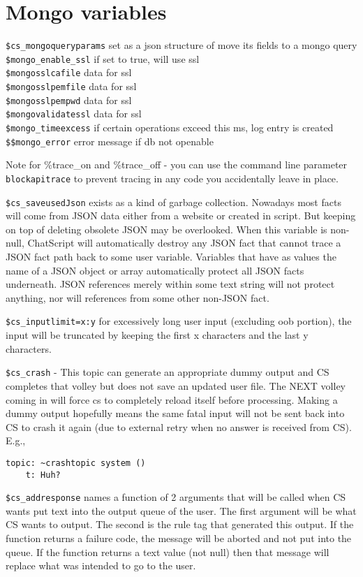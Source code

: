 \documentclass[]{article}
\begin{document}
\section{Mongo variables}\label{mongo-variables}

\texttt{\$cs\_mongoqueryparams} \textbar{} set as a json structure of
move its fields to a mongo query \textbar{}\\
\texttt{\$mongo\_enable\_ssl} \textbar{} if set to true, will use ssl
\textbar{}\\
\texttt{\$mongosslcafile} \textbar{} data for ssl \textbar{}\\
\texttt{\$mongosslpemfile} \textbar{} data for ssl \textbar{}\\
\texttt{\$mongosslpempwd} \textbar{} data for ssl \textbar{}\\
\texttt{\$mongovalidatessl} \textbar{} data for ssl \textbar{}\\
\texttt{\$mongo\_timeexcess} \textbar{} if certain operations exceed
this ms, log entry is created \textbar{}\\
\texttt{\$\$mongo\_error} \textbar{} error message if db not openable
\textbar{}

Note for \%trace\_on and \%trace\_off - you can use the command line
parameter \texttt{blockapitrace} to prevent tracing in any code you
accidentally leave in place.

\texttt{\$cs\_saveusedJson} exists as a kind of garbage collection.
Nowadays most facts will come from JSON data either from a website or
created in script. But keeping on top of deleting obsolete JSON may be
overlooked. When this variable is non-null, ChatScript will
automatically destroy any JSON fact that cannot trace a JSON fact path
back to some user variable. Variables that have as values the name of a
JSON object or array automatically protect all JSON facts underneath.
JSON references merely within some text string will not protect
anything, nor will references from some other non-JSON fact.

\texttt{\$cs\_inputlimit=x:y} for excessively long user input (excluding
oob portion), the input will be truncated by keeping the first x
characters and the last y characters.

\texttt{\$cs\_crash} - This topic can generate an appropriate dummy
output and CS completes that volley but does not save an updated user
file. The NEXT volley coming in will force cs to completely reload
itself before processing. Making a dummy output hopefully means the same
fatal input will not be sent back into CS to crash it again (due to
external retry when no answer is received from CS). E.g.,

\begin{verbatim}
topic: ~crashtopic system ()
    t: Huh?
\end{verbatim}

\texttt{\$cs\_addresponse} names a function of 2 arguments that will be
called when CS wants put text into the output queue of the user. The
first argument will be what CS wants to output. The second is the rule
tag that generated this output. If the function returns a failure code,
the message will be aborted and not put into the queue. If the function
returns a text value (not null) then that message will replace what was
intended to go to the user.
\end{document}
